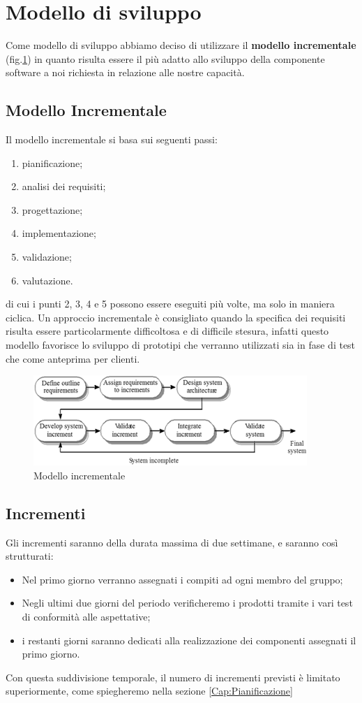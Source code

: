\section{Modello di sviluppo}
	Come modello di sviluppo abbiamo deciso di utilizzare il \textbf{modello incrementale} (fig.\ref{fig::Model}) in quanto risulta essere il più adatto allo sviluppo della componente software a noi richiesta in relazione alle nostre capacità. 
	
	\subsection{Modello Incrementale}
		Il modello incrementale si basa sui seguenti passi:
		\begin{enumerate}
			\item pianificazione;
			\item analisi dei requisiti\pedice;
			\item progettazione;
			\item implementazione;
			\item validazione;
			\item valutazione.
		\end{enumerate}
		di cui i punti 2, 3, 4 e 5 possono essere eseguiti più volte, ma solo in maniera ciclica. Un approccio incrementale è consigliato quando la specifica dei requisiti risulta essere particolarmente difficoltosa e di difficile stesura, infatti questo modello favorisce lo sviluppo di prototipi che verranno utilizzati sia in fase di test che come anteprima per clienti.

		\begin{figure}[!htpb]
			\centering
		    \includegraphics{IterativeModel.png}
			\caption{Modello incrementale}
			\label{fig::Model}
		\end{figure}

    \subsection{Incrementi}
        Gli incrementi saranno della durata massima di due settimane, e saranno così strutturati:
        \begin{itemize}
            \item Nel primo giorno verranno assegnati i compiti ad ogni membro del gruppo;
            \item Negli ultimi due giorni del periodo verificheremo i prodotti tramite i vari test di conformità alle aspettative;
            \item i restanti giorni saranno dedicati alla realizzazione dei componenti assegnati il primo giorno.
        \end{itemize}
        Con questa suddivisione temporale, il numero di incrementi previsti è limitato superiormente, come spiegheremo nella sezione \ref{Cap:Pianificazione}